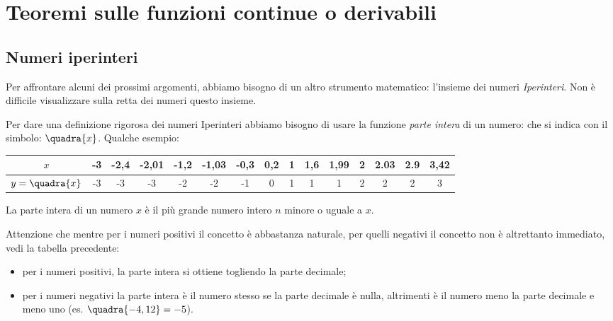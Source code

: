


\chapter{Teoremi sulle funzioni continue o derivabili}

% 

\section{Numeri iperinteri}
\label{subsec:cont_iperinteri}

Per affrontare alcuni dei prossimi argomenti, abbiamo bisogno di un altro 
strumento matematico: l'insieme dei numeri \emph{Iperinteri}.
Non è difficile visualizzare sulla retta dei numeri questo insieme.

Per dare una definizione rigorosa dei numeri Iperinteri abbiamo bisogno di 
usare la funzione \emph{parte intera} di un numero: che si indica con il 
simbolo:
\(\quadra{x}\). Qualche esempio:
\begin{center}
\begin{tabular}{ccccccccccccccc}
\(x\) & 
-3&-2,4&-2,01&-1,2&-1,03&-0,3&0,2&1&1,6&1,99&2&2.03&2.9&3,42\\
\hline
\(y=\quadra{x}\) & 
-3&-3  &-3   &-2  &-2   &-1  &0  &1&1  &1   &2&2   &2  &3
\end{tabular}
\end{center}

\begin{minipage}{.59\textwidth}
La parte intera di un numero \(x\) è il più grande numero intero \(n\) 
minore o uguale a \(x\). 

Attenzione che mentre per i numeri positivi il 
concetto è abbastanza naturale, per quelli negativi il concetto non è 
altrettanto immediato, vedi la tabella precedente:
\begin{itemize} [nosep]
\item per i numeri positivi, la parte intera si ottiene togliendo la parte 
decimale;
\item per i numeri negativi la parte intera è il numero stesso se la parte 
decimale è nulla, altrimenti è il numero meno la parte decimale e meno uno
(es. \(\quadra{-4,12}=-5\)).
\end{itemize}
\end{minipage}
\hfill
\begin{minipage}{.39\textwidth}
\begin{center}
\parteintera
\end{center}
\end{minipage}

